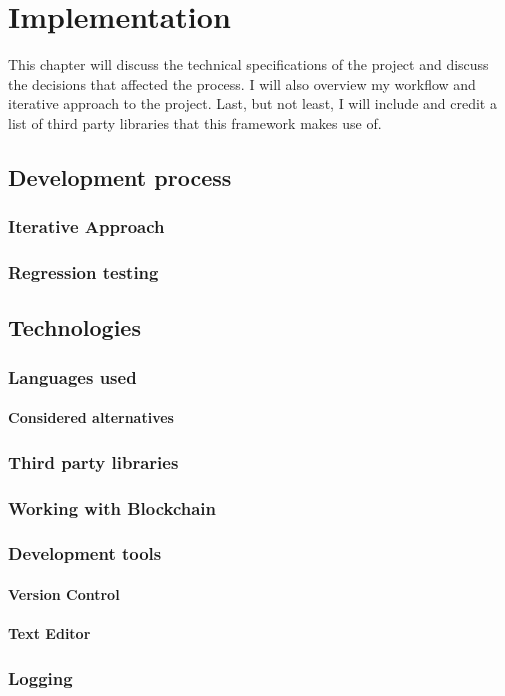 \chapter{Implementation\label{chap:implementation}}
This chapter will discuss the technical specifications of the project and discuss the decisions that affected the process. I will also overview my workflow and iterative approach to the project. Last, but not least, I will include and credit a list of third party libraries that this framework makes use of.

\section{Development process}

\subsection{Iterative Approach}

\subsection{Regression testing}

\section{Technologies}

\subsection{Languages used}

\subsubsection{Considered alternatives}

\subsection{Third party libraries}

\subsection{Working with Blockchain}

\subsection{Development tools}
\subsubsection{Version Control}
\subsubsection{Text Editor}

\subsection{Logging}